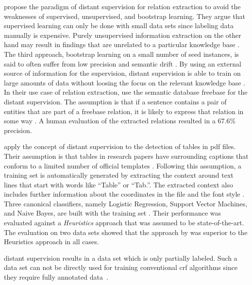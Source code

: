 \bigskip

\citet{mintz2009distant} propose the paradigm of \gls{distant supervision} for relation extraction to avoid the weaknesses of supervised, unsupervised, and bootstrap learning.
They argue that supervised learning can only be done with small data sets since labeling data manually is expensive.
Purely unsupervised information extraction on the other hand may result in findings that are unrelated to a particular knowledge base \citep{mintz2009distant}.
The third approach, bootstrap learning on a small number of seed instances, is said to often suffer from low precision and semantic drift \citep{mintz2009distant}.
By using an external source of information for the supervision, \gls{distant supervision} is able to train on large amounts of data without loosing the focus on the relevant knowledge base \citep{mintz2009distant}.
In their use case of relation extraction, \citet{mintz2009distant} use the semantic database \gls{freebase} \citep{bollacker2008freebase} for the \gls{distant supervision}.
The assumption is that if a sentence contains a pair of entities that are part of a \gls{freebase} relation, it is likely to express that relation in some way \citep{mintz2009distant}.
A human evaluation of the extracted relations resulted in a 67.6\% precision.

\citet{fan2015detecting} apply the concept of \gls{distant supervision} to the detection of tables in \gls{pdf} files.
Their assumption is that tables in research papers have surrounding captions that conform to a limited number of official templates \citep{fan2015detecting}.
Following this assumption, a training set is automatically generated by extracting the context around text lines that start with words like ``Table'' or ``Tab.''.
The extracted context also includes further information about the coordinates in the file and the font style \citep{fan2015detecting}.
Three canonical classifiers, namely Logistic Regression, Support Vector Machines, and Naive Bayes, are built with the training set \citep{fan2015detecting}.
Their performance was evaluated against a \emph{Heuristics} approach \citep{klampfl2014comparison} that was assumed to be state-of-the-art.
The evaluation on two data sets showed that the approach by \citet{fan2015detecting} was superior to the Heuristics approach in all cases.

\bigskip

\Gls{distant supervision} results in a data set which is only partially labeled.
Such a data set can not be directly used for training conventional \gls{crf} algorithms since they require fully annotated data~\citep{tsuboi2008training}.

